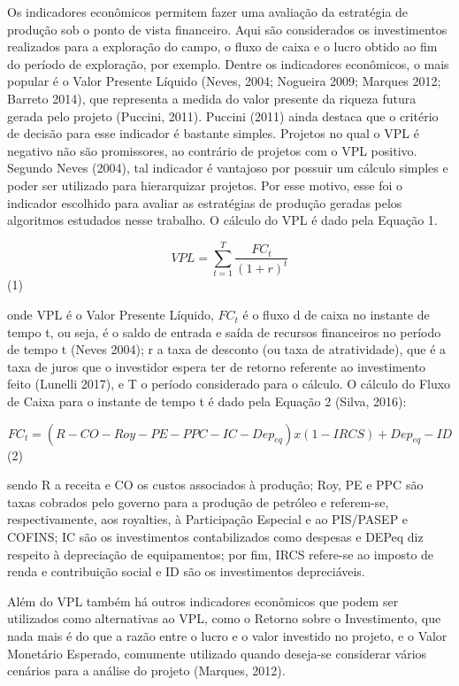 Os indicadores econômicos permitem fazer uma avaliação da estratégia de produção sob o ponto de vista financeiro. Aqui são considerados os investimentos realizados para a exploração do campo, o fluxo de caixa e o lucro obtido ao fim do período de exploração, por exemplo. Dentre os indicadores econômicos, o mais popular é o Valor Presente Líquido (Neves, 2004; Nogueira 2009; Marques 2012; Barreto 2014), que representa a medida do valor presente da riqueza futura gerada pelo projeto (Puccini, 2011). Puccini (2011) ainda destaca que o critério de decisão para esse indicador é bastante simples. Projetos no qual o VPL é negativo não são promissores, ao contrário de projetos com o VPL positivo. Segundo Neves (2004), tal indicador é vantajoso por possuir um cálculo simples e poder ser utilizado para hierarquizar projetos. Por esse motivo, esse foi o indicador escolhido para avaliar as estratégias de produção geradas pelos algoritmos estudados nesse trabalho.  O cálculo do VPL é dado pela Equação 1.


$$ VPL = \sum_{t=1}^{T} \frac{FC_t}{(1+r)^t} $$ (1)

onde VPL é o Valor Presente Líquido, $FC_t$  é o fluxo d de caixa no instante de tempo t, ou seja, é o saldo de entrada e saída de recursos financeiros no período de tempo t (Neves 2004); r a taxa de desconto (ou taxa de atratividade), que é a taxa de juros que o investidor espera ter de retorno referente ao investimento feito (Lunelli 2017),  e T o período considerado para o cálculo. O cálculo do Fluxo de Caixa para o instante de tempo t é dado pela Equação 2 (Silva, 2016):

$$ FC_t = (R-CO-Roy-PE-PPC-IC- Dep_{eq} )x(1-IRCS)+ Dep_{eq} - ID $$ (2)
 
sendo R a receita e CO os custos associados à produção; Roy, PE e PPC são taxas cobrados pelo governo para a produção de petróleo e referem-se, respectivamente, aos royalties, à Participação Especial e ao PIS/PASEP e COFINS; IC são os investimentos contabilizados como despesas e DEPeq diz respeito à depreciação de equipamentos; por fim, IRCS refere-se ao imposto de renda e contribuição social e ID são os investimentos depreciáveis.

Além do VPL também há outros indicadores econômicos que podem ser utilizados como alternativas ao VPL, como o Retorno sobre o Investimento, que nada mais é do que a razão entre o lucro e o valor investido no projeto, e o Valor Monetário Esperado, comumente utilizado quando deseja-se considerar vários cenários para a análise do projeto (Marques, 2012).

